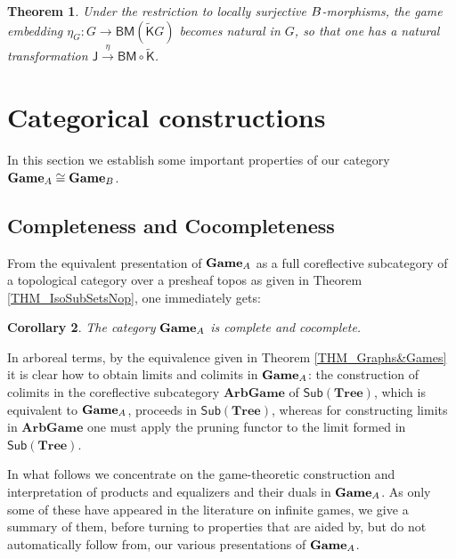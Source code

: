 \documentclass[12pt]{amsart}
\newtheorem{thm}{Theorem}[section]
\newtheorem{cor}[thm]{Corollary}
\theoremstyle{definition}
\newcommand{\A}{\textup{\textmd{\textsc{A}}}}
\newcommand{\B}{\textup{\textmd{\textsc{B}}}}
\newcommand{\K}{\mathsf{K}}
\newcommand{\Tree}{\mathbf{Tree}}
\newcommand{\TrGame}{\mathbf{ArbGame}}
\newcommand{\BM}{\mathsf{B}\mathsf{M}}
\newcommand{\Games}{\mathbf{Game}}
\newcommand{\Sub}[1]{\mathsf{Sub}\left({#1}\right)}
\begin{document}
\begin{thm}\label{THM_BMUni_Fun}
	Under the restriction to locally surjective $\B$-morphisms, the game embedding $\eta_G:G\to \BM(\tilde{\mathsf K}G)$ becomes natural in $G$, so that one has a natural transformation
	$\mathsf{J}\stackrel{\eta}{\to}\BM\circ \tilde{\K}$. 
\end{thm}  





\section{Categorical constructions}\label{SEC_CatProp}
In this section we establish some important properties of our category $\Games_\A\cong\Games_\B$. 

\subsection{Completeness and Cocompleteness}
From the equivalent presentation of $\Games_{\A}$ as a full coreflective subcategory of a topological category over a presheaf topos as given in Theorem \ref{THM_IsoSubSetsNop}, one immediately gets:

\begin{cor}
	The category $\Games_\A$ is complete and cocomplete.
\end{cor}

In arboreal terms, by the equivalence given in Theorem \ref{THM_Graphs&Games} it is clear how to obtain limits and colimits in $\Games_{\A}$: the construction of colimits in the coreflective subcategory $\TrGame$ of $ \Sub{\Tree}$, which is equivalent to $\Games_\A$, proceeds in $\Sub{\Tree}$, whereas for constructing limits in $\TrGame$ one must apply the pruning functor to the limit formed in $\Sub{\Tree}$.

In what follows we concentrate on the game-theoretic construction and interpretation of products and equalizers and their duals in $\Games_\A$.  As only some of these have appeared in the literature on infinite games, we give a summary of them, before turning to properties that are aided by, but do not automatically follow from, our various presentations of $\Games_{\A}$. 
\end{document}
